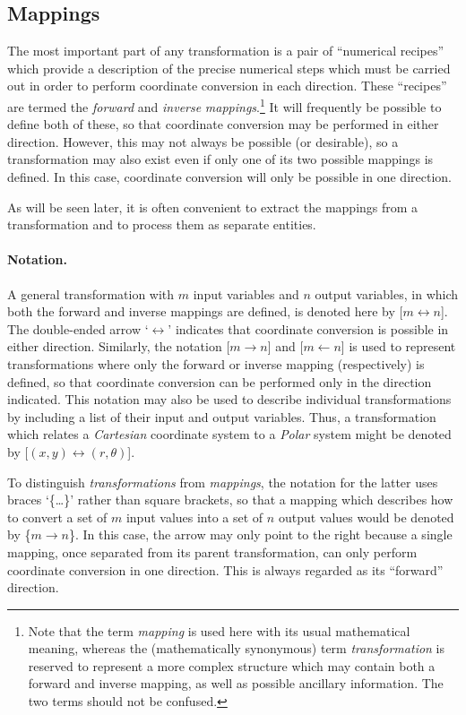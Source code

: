 \documentclass[twoside,11pt]{article}
\newcommand{\xlabel}[1]{}
\begin{document}
\subsection{\xlabel{mappings}Mappings}

The most important part of any transformation is a pair of ``numerical
recipes'' which provide a description of the precise numerical steps which
must be carried out in order to perform coordinate conversion in each
direction. 
These ``recipes'' are termed the \emph{forward} and \emph{inverse}
\emph{mappings}.\footnote{ 
Note that the term \emph{mapping} is used here with its usual mathematical 
meaning, whereas the (mathematically synonymous) term \emph{transformation} 
is reserved to represent a more complex structure which may contain both a 
forward and inverse mapping, as well as possible ancillary information.
The two terms should not be confused.}
It will frequently be possible to define both of these, so that coordinate
conversion may be performed in either direction. 
However, this may not always be possible (or desirable), so a transformation
may also exist even if only one of its two possible mappings is defined. 
In this case, coordinate conversion will only be possible in one direction. 

As will be seen later, it is often convenient to extract the mappings from
a transformation and to process them as separate entities. 


\paragraph{Notation.}
A general transformation with $m$ input variables and $n$ output variables,
in which both the forward and inverse mappings are defined, is denoted here
by \mbox{[$m \leftrightarrow n$]}. 
The double-ended arrow `$\leftrightarrow$' indicates that coordinate
conversion is possible in either direction. 
Similarly, the notation \mbox{[$m \rightarrow n$]} and \mbox{[$m \leftarrow
n$]} is used to represent transformations where only the forward or inverse
mapping (respectively) is defined, so that coordinate conversion can be
performed only in the direction indicated. 
This notation may also be used to describe individual transformations by
including a list of their input and output variables.
Thus, a transformation which relates a \emph{Cartesian} coordinate system to
a \emph{Polar} system might be denoted by \mbox{[$(x,y) \leftrightarrow
(r,\theta)$]}. 

To distinguish \emph{transformations} from \emph{mappings}, the notation for 
the latter uses braces `\{\ldots\}' rather than square brackets, so that a
mapping which describes how to convert a set of $m$ input values into a set
of $n$ output values would be denoted by \mbox{\{$m \rightarrow n$\}}. 
In this case, the arrow may only point to the right because a single
mapping, once separated from its parent transformation, can only perform
coordinate conversion in one direction. 
This is always regarded as its ``forward'' direction. 
\end{document}
